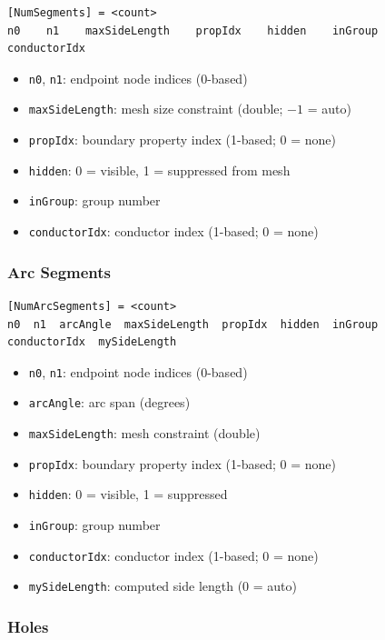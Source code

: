 \documentclass[11pt]{article}
\begin{document}
\begin{lstlisting}
[NumSegments] = <count>
n0    n1    maxSideLength    propIdx    hidden    inGroup    conductorIdx
\end{lstlisting}

\begin{itemize}[nosep]
  \item \texttt{n0}, \texttt{n1}: endpoint node indices (0-based)
  \item \texttt{maxSideLength}: mesh size constraint (double; $-1$ = auto)
  \item \texttt{propIdx}: boundary property index (1-based; 0 = none)
  \item \texttt{hidden}: 0 = visible, 1 = suppressed from mesh
  \item \texttt{inGroup}: group number
  \item \texttt{conductorIdx}: conductor index (1-based; 0 = none)
\end{itemize}

\subsubsection{Arc Segments}

\begin{lstlisting}
[NumArcSegments] = <count>
n0  n1  arcAngle  maxSideLength  propIdx  hidden  inGroup  conductorIdx  mySideLength
\end{lstlisting}

\begin{itemize}[nosep]
  \item \texttt{n0}, \texttt{n1}: endpoint node indices (0-based)
  \item \texttt{arcAngle}: arc span (degrees)
  \item \texttt{maxSideLength}: mesh constraint (double)
  \item \texttt{propIdx}: boundary property index (1-based; 0 = none)
  \item \texttt{hidden}: 0 = visible, 1 = suppressed
  \item \texttt{inGroup}: group number
  \item \texttt{conductorIdx}: conductor index (1-based; 0 = none)
  \item \texttt{mySideLength}: computed side length (0 = auto)
\end{itemize}

\subsubsection{Holes}
\end{document}
